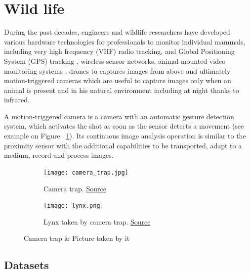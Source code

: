 \pagebreak\section{Wild life}

During the past decades, engineers and wildlife researchers have developed various hardware technologies for professionals to monitor individual mammals,
including very high frequency (VHF) radio tracking\cite{radio1983}\cite{inradio}\cite{satellite2018}, 
and Global Positioning System (GPS) tracking \cite{zebranet2002}\cite{gps2001}\cite{kruger2016inexpensive},
wireless sensor networks\cite{sensornet2002}\cite{sensornet2004},  
animal-mounted video monitoring systems \cite{portablecamera2008}, 
drones to captures images from above\cite{s16010097} and ultimately motion-triggered cameras which are useful to capture images only when an animal is present and in his natural environment including at night thanks to infrared.


A motion-triggered camera is a camera with an automatic gesture detection system, which activates the shot as soon as the sensor detects a movement (see example on Figure ~\ref{fig:camtrap}). 
Its continuous image analysis operation is similar to the proximity sensor with the additional capabilities to be transported, adapt to a medium, record and process images.

\begin{figure}[H]
\centering
\begin{subfigure}{.5\textwidth}
  \centering
  \texttt{[image: camera\_trap.jpg]}
  \caption{Camera trap. \href{https://shop.naturespy.org/wp-content/uploads/2014/05/Ltl-Acorn-camera-trap-1.jpg}{Source}}
\end{subfigure}%
\begin{subfigure}{.5\textwidth}
  \centering
  \texttt{[image: lynx.png]}
  \caption{Lynx taken by camera trap. \href{https://agenda.ge/en/news/2015/2337}{Source}}
\end{subfigure}
\caption{Camera trap \& Picture taken by it}
\label{fig:camtrap}
\end{figure}

\pagebreak\subsection{Datasets}

